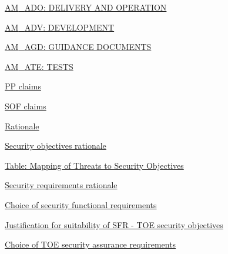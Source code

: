 \documentclass[10pt,a4paper,english]{article}
\begin{document}
\begin{list}{}{}
\begin{list}{}{}
\begin{list}{}{}
\item {} \href{\#am-ado-delivery-and-operation}{AM{\_}ADO: DELIVERY AND OPERATION}

\item {} \href{\#am-adv-development}{AM{\_}ADV: DEVELOPMENT}

\item {} \href{\#am-agd-guidance-documents}{AM{\_}AGD: GUIDANCE DOCUMENTS}

\item {} \href{\#am-ate-tests}{AM{\_}ATE: TESTS}

\end{list}

\end{list}

\item {} \href{\#pp-claims}{PP claims}

\item {} \href{\#sof-claims}{SOF claims}

\item {} \href{\#rationale}{Rationale}
\begin{list}{}{}
\item {} \href{\#security-objectives-rationale}{Security objectives rationale}
\begin{list}{}{}
\item {} \href{\#table-mapping-of-threats-to-security-objectives}{Table: Mapping of Threats to Security Objectives}

\end{list}

\item {} \href{\#security-requirements-rationale}{Security requirements rationale}
\begin{list}{}{}
\item {} \href{\#choice-of-security-functional-requirements}{Choice of security functional requirements}

\end{list}

\item {} \href{\#justification-for-suitability-of-sfr-toe-security-objectives}{Justification for suitability of SFR - TOE security objectives}
\begin{list}{}{}
\item {} \href{\#choice-of-toe-security-assurance-requirements}{Choice of TOE security assurance requirements}

\end{list}


\end{list}
\end{list}
\end{document}
